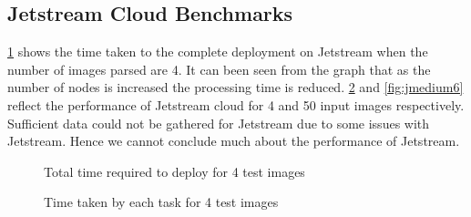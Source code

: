 \documentclass[9pt,twocolumn,twoside]{../../styles/osajnl}
\begin{document}
\subsection{Jetstream Cloud Benchmarks}

\ref{fig:jmedium4} shows the time taken to the complete deployment on
Jetstream when the number of images parsed are 4. It can been seen
from the graph that as the number of nodes is increased the processing
time is reduced. \ref{fig:jmedium5} and \ref{fig:jmedium6} reflect the
performance of Jetstream cloud for 4 and 50 input images
respectively. Sufficient data could not be gathered for Jetstream due
to some issues with Jetstream. Hence we cannot conclude much about the
performance of Jetstream.

\begin{figure}[htbp]
\centering
{}
\caption{Total time required to deploy for 4 test images}
\label{fig:jmedium4}
\end{figure}

\begin{figure}[htbp]
\centering
{}
\caption{Time taken by each task for 4 test images}
\label{fig:jmedium5}
\end{figure}
\end{document}
